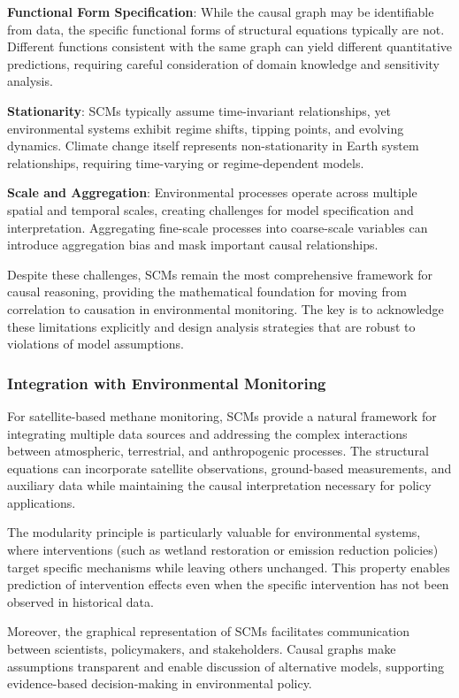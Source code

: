 \textbf{Functional Form Specification}: While the causal graph may be identifiable from data, the specific functional forms of structural equations typically are not. Different functions consistent with the same graph can yield different quantitative predictions, requiring careful consideration of domain knowledge and sensitivity analysis.

\textbf{Stationarity}: SCMs typically assume time-invariant relationships, yet environmental systems exhibit regime shifts, tipping points, and evolving dynamics. Climate change itself represents non-stationarity in Earth system relationships, requiring time-varying or regime-dependent models.

\textbf{Scale and Aggregation}: Environmental processes operate across multiple spatial and temporal scales, creating challenges for model specification and interpretation. Aggregating fine-scale processes into coarse-scale variables can introduce aggregation bias and mask important causal relationships.

Despite these challenges, SCMs remain the most comprehensive framework for causal reasoning, providing the mathematical foundation for moving from correlation to causation in environmental monitoring. The key is to acknowledge these limitations explicitly and design analysis strategies that are robust to violations of model assumptions.

\subsubsection{Integration with Environmental Monitoring}

For satellite-based methane monitoring, SCMs provide a natural framework for integrating multiple data sources and addressing the complex interactions between atmospheric, terrestrial, and anthropogenic processes. The structural equations can incorporate satellite observations, ground-based measurements, and auxiliary data while maintaining the causal interpretation necessary for policy applications.

The modularity principle is particularly valuable for environmental systems, where interventions (such as wetland restoration or emission reduction policies) target specific mechanisms while leaving others unchanged. This property enables prediction of intervention effects even when the specific intervention has not been observed in historical data.

Moreover, the graphical representation of SCMs facilitates communication between scientists, policymakers, and stakeholders. Causal graphs make assumptions transparent and enable discussion of alternative models, supporting evidence-based decision-making in environmental policy.

